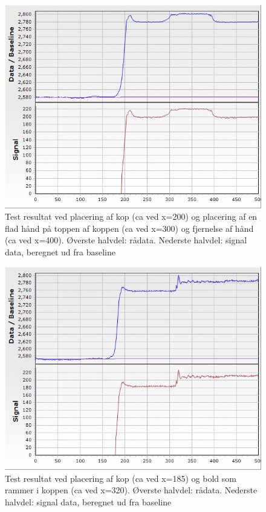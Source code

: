 \documentclass[HardwareDesign/HardwareDesign_main.tex]{subfiles}
\begin{document}
\begin{figure}[H]
    \centering
    \includegraphics[width=\textwidth]{HardwareDesign/CupSensor/graphics/CapTest/placingCupAndPutingHandOnTop1(beer).jpg}
    \caption{Test resultat ved placering af kop (ca ved x=200) og placering af en flad hånd på toppen af koppen (ca ved x=300) og fjernelse af hånd (ca ved x=400). Øverste halvdel: rådata. Nederste halvdel: signal data, beregnet ud fra baseline}
    \label{fig:cap_test_place_and_hand_110}
\end{figure}

\begin{figure}[H]
    \centering
    \includegraphics[width=\textwidth]{HardwareDesign/CupSensor/graphics/CapTest/placingCupAndDroppingBall1(beer).jpg}
    \caption{Test resultat ved placering af kop (ca ved x=185) og bold som rammer i koppen (ca ved x=320). Øverste halvdel: rådata. Nederste halvdel: signal data, beregnet ud fra baseline}
    \label{fig:cap_test_place_and_drop_110}
\end{figure}
\end{document}
